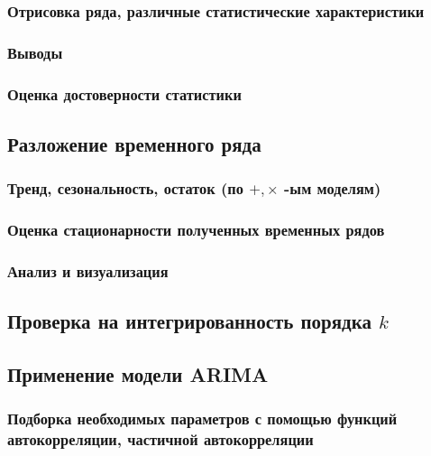 \documentclass{article}
\begin{document}
    \subsubsection{Отрисовка ряда, различные статистические характеристики}
    
    \subsubsection{Выводы}
    
    \subsubsection{Оценка достоверности статистики}
  
  \newpage
    
  \subsection{Разложение временного ряда}
    
    \subsubsection{Тренд, сезональность, остаток (по $+, \times$ -ым моделям)} 
    
    \subsubsection{Оценка стационарности полученных временных рядов}
    
    \subsubsection{Анализ и визуализация}
  
  \newpage
    
  \subsection{Проверка на интегрированность порядка $k$}
  
  \subsection{Применение модели ARIMA}
    
    \subsubsection{Подборка необходимых параметров с помощью функций автокорреляции, частичной автокорреляции}
    
\end{document}
